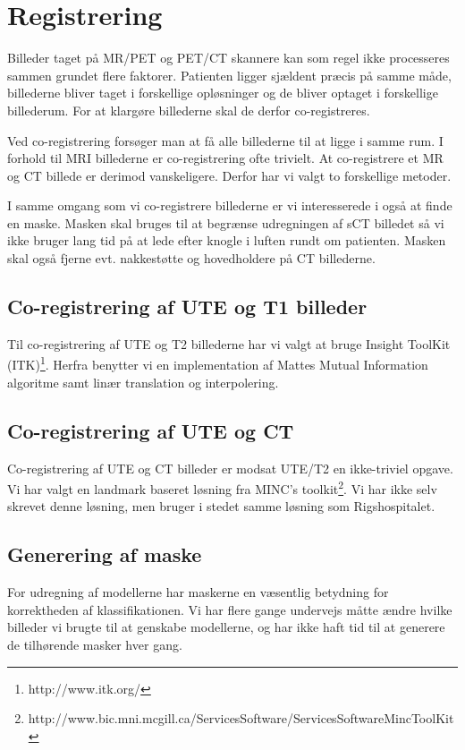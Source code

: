 \section{Registrering}

Billeder taget på MR/PET og PET/CT skannere kan som regel ikke
processeres sammen grundet flere faktorer. Patienten ligger sjældent
præcis på samme måde, billederne bliver taget i forskellige
opløsninger og de bliver optaget i forskellige billederum. For at
klargøre billederne skal de derfor co-registreres.

Ved co-registrering forsøger man at få alle billederne til at ligge i
samme rum. I forhold til MRI billederne er co-registrering ofte trivielt.
At co-registrere et MR og CT billede er derimod vanskeligere. Derfor har
vi valgt to forskellige metoder.

I samme omgang som vi co-registrere billederne er vi interesserede i
også at finde en maske. Masken skal bruges til at begrænse udregningen
af sCT billedet så vi ikke bruger lang tid på at lede efter knogle i
luften rundt om patienten. Masken skal også fjerne evt. nakkestøtte og
hovedholdere på CT billederne.

\subsection{Co-registrering af UTE og T1 billeder}

Til co-registrering af UTE og T2 billederne har vi valgt at bruge
Insight ToolKit (ITK)\footnote{http://www.itk.org/}. Herfra benytter vi en implementation af Mattes
Mutual Information algoritme samt linær translation og interpolering.

\subsection{Co-registrering af UTE og CT}

Co-registrering af UTE og CT billeder er modsat UTE/T2 en ikke-triviel
opgave. Vi har valgt en landmark baseret løsning fra MINC's toolkit\footnote{http://www.bic.mni.mcgill.ca/ServicesSoftware/ServicesSoftwareMincToolKit}.
Vi har ikke selv skrevet denne løsning, men bruger i stedet samme
løsning som Rigshospitalet.

\subsection{Generering af maske}

For udregning af modellerne har maskerne en væsentlig betydning for korrektheden af klassifikationen. Vi har flere gange undervejs måtte ændre hvilke billeder vi brugte til at genskabe modellerne, og har ikke haft tid til at generere de tilhørende masker hver gang.

